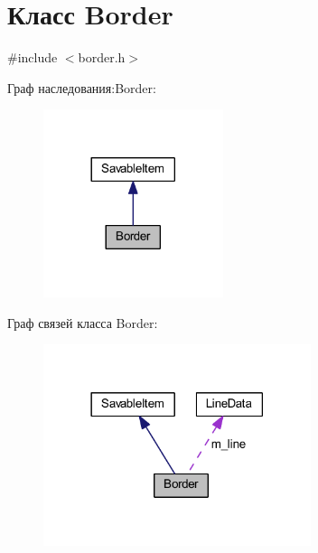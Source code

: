 \hypertarget{class_border}{\section{Класс Border}
\label{class_border}
}


{\ttfamily \#include $<$border.\-h$>$}



Граф наследования\-:Border\-:
\nopagebreak
\begin{figure}[H]
\begin{center}
\leavevmode
\includegraphics[width=149pt]{class_border__inherit__graph}
\end{center}
\end{figure}


Граф связей класса Border\-:
\nopagebreak
\begin{figure}[H]
\begin{center}
\leavevmode
\includegraphics[width=222pt]{class_border__coll__graph}
\end{center}
\end{figure}
